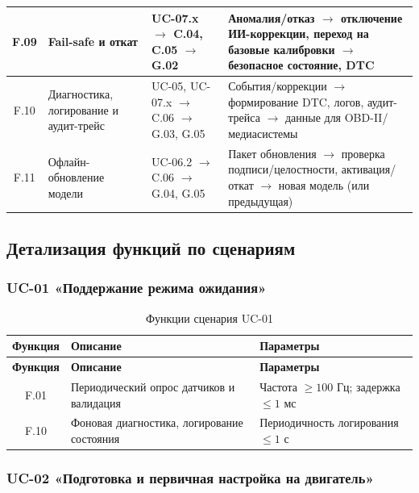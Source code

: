 \documentclass[14pt, a4paper]{extarticle}
\begin{document}
\begin{xltabular}{\textwidth}{|c|L|L|L|}
						\hline
						F.09 & Fail-safe и откат & UC-07.x \(\to\) C.04, C.05 \(\to\) G.02 & Аномалия/отказ \(\to\) отключение ИИ-коррекции, переход на базовые калибровки \(\to\) безопасное состояние, DTC \\
						\hline
						F.10 & Диагностика, логирование и аудит-трейс & UC-05, UC-07.x \(\to\) C.06 \(\to\) G.03, G.05 & События/коррекции \(\to\) формирование DTC, логов, аудит-трейса \(\to\) данные для OBD-II/медиасистемы \\
						\hline
						F.11 & Офлайн-обновление модели & UC-06.2 \(\to\) C.06 \(\to\) G.04, G.05 & Пакет обновления \(\to\) проверка подписи/целостности, активация/откат \(\to\) новая модель (или предыдущая) \\
						\hline
					\end{xltabular}
					
					\subsection{Детализация функций по сценариям}
					
					\subsubsection{UC-01 «Поддержание режима ожидания»}
					
					\begin{xltabular}{\textwidth}{|c|L|L|}
						\caption{Функции сценария UC-01}\label{tab:func-uc01}\\
						\hline
						\textbf{Функция} & \textbf{Описание} & \textbf{Параметры} \\
						\hline
						\endfirsthead
						\hline
						\textbf{Функция} & \textbf{Описание} & \textbf{Параметры} \\
						\hline
						\endhead
						\hline
						\endfoot
						\hline
						\endlastfoot
						F.01 & Периодический опрос датчиков и валидация & Частота \(\geq 100\) Гц; задержка \(\leq 1\) мс \\
						\hline
						F.10 & Фоновая диагностика, логирование состояния & Периодичность логирования \(\leq 1\) с \\
						\hline
					\end{xltabular}
					
					\subsubsection{UC-02 «Подготовка и первичная настройка на двигатель»}
					
\end{document}
